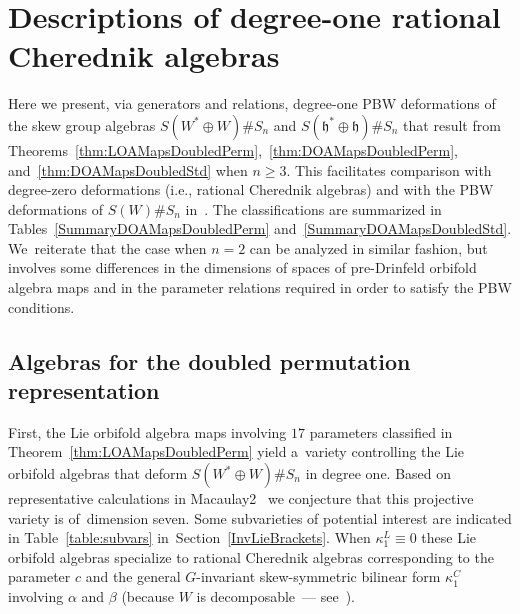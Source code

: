 \documentclass[pdftex]{sigma}
\numberwithin{equation}{section}
\begin{document}
\section{Descriptions of degree-one rational Cherednik algebras}\label{Deg1RCAs}


Here we present, via generators and relations, degree-one PBW deformations
of the skew group algebras $S(W^* \oplus W) \# S_n$ and $S(\mathfrak{h}^* \oplus \mathfrak{h})\# S_n$
that result from Theorems~\ref{thm:LOAMapsDoubledPerm},~\ref{thm:DOAMapsDoubledPerm},
and~\ref{thm:DOAMapsDoubledStd} when \mbox{$n \geq 3$}. This facilitates comparison with degree-zero
deformations (i.e., rational Cherednik algebras) and with the PBW deformations of
$S(W)\# S_n$ in~\cite{FGK}. The classifications are summarized in
Tables~\ref{SummaryDOAMapsDoubledPerm} and~\ref{SummaryDOAMapsDoubledStd}. We~reiterate that the case when $n=2$ can be analyzed in similar fashion, but involves
some differences in the dimensions of spaces of pre-Drinfeld
orbifold algebra maps and in the parameter relations required in order to satisfy the
PBW conditions.

\subsection{Algebras for the doubled permutation representation}\label{AlgsDoubledPermRep}

First, the Lie orbifold algebra maps involving $17$ parameters classified in
Theorem~\ref{thm:LOAMapsDoubledPerm} yield a~variety controlling
the Lie orbifold algebras that deform $S(W^* \oplus W) \# S_n$ in degree one.
Based on representative calculations in Macaulay2~\cite{M2} we conjecture
that this projective variety is of~dimension seven. Some subvarieties of potential
interest are indicated in Table~\ref{table:subvars} in~Section~\ref{InvLieBrackets}.
When $\kappa^L_1 \equiv 0$ these Lie orbifold algebras
specialize to rational Cherednik algebras corresponding to the parameter $c$ and the general
$G$-invariant skew-symmetric bilinear form $\kappa^C_1$ involving $\alpha$ and $\beta$
(because $W$ is decomposable~--- see~\cite[proof of Theorem 1.3]{EtingofGinzburg2002}).
\end{document}
